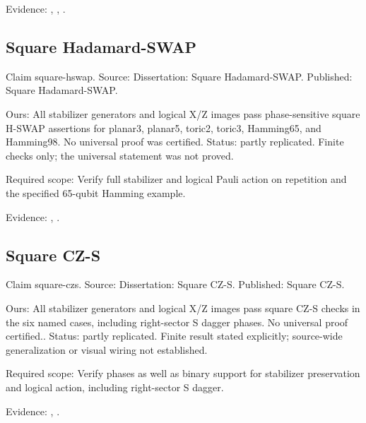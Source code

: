 Evidence: \href{https://github.com/alectionary/vibe-math/blob/master/formalization/quintavalle-hgp/sources/browser-extraction.txt}{}, \href{https://github.com/alectionary/vibe-math/blob/master/formalization/quintavalle-hgp/availability.md}{}, \href{https://github.com/alectionary/vibe-math/blob/master/formalization/quintavalle-hgp/results/independent_checks.json}{}.
\subsection{Square Hadamard-SWAP}\label{claim:square-hswap}
Claim square-hswap. Source: Dissertation: Square Hadamard-SWAP. Published: Square Hadamard-SWAP.

Ours: All stabilizer generators and logical X/Z images pass phase-sensitive square H-SWAP assertions for planar3, planar5, toric2, toric3, Hamming65, and Hamming98. No universal proof was certified. Status: partly replicated. Finite checks only; the universal statement was not proved.

Required scope: Verify full stabilizer and logical Pauli action on repetition and the specified 65-qubit Hamming example.

Evidence: \href{https://github.com/alectionary/vibe-math/blob/master/formalization/quintavalle-hgp/sources/browser-extraction.txt}{}, \href{https://github.com/alectionary/vibe-math/blob/master/formalization/quintavalle-hgp/availability.md}{}.
\subsection{Square CZ-S}\label{claim:square-czs}
Claim square-czs. Source: Dissertation: Square CZ-S. Published: Square CZ-S.

Ours: All stabilizer generators and logical X/Z images pass square CZ-S checks in the six named cases, including right-sector S dagger phases. No universal proof certified.. Status: partly replicated. Finite result stated explicitly; source-wide generalization or visual wiring not established.

Required scope: Verify phases as well as binary support for stabilizer preservation and logical action, including right-sector S dagger.

Evidence: \href{https://github.com/alectionary/vibe-math/blob/master/formalization/quintavalle-hgp/sources/browser-extraction.txt}{}, \href{https://github.com/alectionary/vibe-math/blob/master/formalization/quintavalle-hgp/availability.md}{}.
